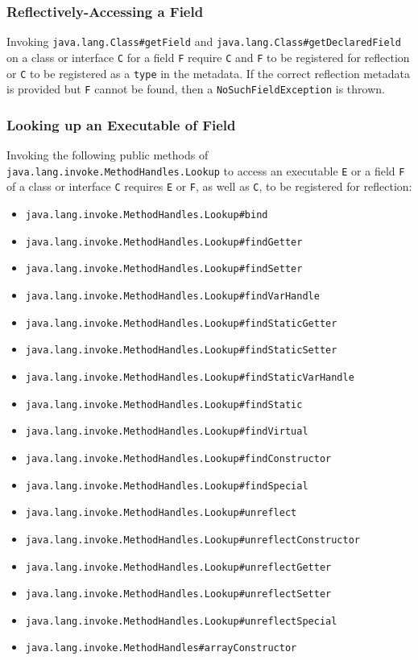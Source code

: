 \subsubsection{Reflectively-Accessing a Field}
Invoking \texttt{java.lang.Class\#getField} and \texttt{java.lang.Class\#getDeclaredField} on a class or interface \verb|C| for a field \verb|F| require \verb|C| and \verb|F| to be registered for reflection or \verb|C| to be registered as a \texttt{type} in the metadata. If the correct reflection metadata is provided but \verb|F| cannot be found, then a \texttt{NoSuchFieldException} is thrown.

\subsubsection{Looking up an Executable of Field}
Invoking the following public methods of \texttt{java.lang.invoke.MethodHandles.Lookup} to access an executable \verb|E| or a field \verb|F| of a class or interface \verb|C| requires \verb|E| or \verb|F|, as well as \verb|C|, to be registered for reflection: 

\begin{itemize}
    \item \texttt{java.lang.invoke.MethodHandles.Lookup\#bind} 
    \item \texttt{java.lang.invoke.MethodHandles.Lookup\#findGetter} 
    \item \texttt{java.lang.invoke.MethodHandles.Lookup\#findSetter} 
    \item \texttt{java.lang.invoke.MethodHandles.Lookup\#findVarHandle} 
    \item \texttt{java.lang.invoke.MethodHandles.Lookup\#findStaticGetter} 
    \item \texttt{java.lang.invoke.MethodHandles.Lookup\#findStaticSetter} 
    \item \texttt{java.lang.invoke.MethodHandles.Lookup\#findStaticVarHandle} 
    \item \texttt{java.lang.invoke.MethodHandles.Lookup\#findStatic} 
    \item \texttt{java.lang.invoke.MethodHandles.Lookup\#findVirtual} 
    \item \texttt{java.lang.invoke.MethodHandles.Lookup\#findConstructor} 
    \item \texttt{java.lang.invoke.MethodHandles.Lookup\#findSpecial} 
    \item \texttt{java.lang.invoke.MethodHandles.Lookup\#unreflect} 
    \item \texttt{java.lang.invoke.MethodHandles.Lookup\#unreflectConstructor} 
    \item \texttt{java.lang.invoke.MethodHandles.Lookup\#unreflectGetter} 
    \item \texttt{java.lang.invoke.MethodHandles.Lookup\#unreflectSetter} 
    \item \texttt{java.lang.invoke.MethodHandles.Lookup\#unreflectSpecial} 
    \item \texttt{java.lang.invoke.MethodHandles\#arrayConstructor}
\end{itemize}

